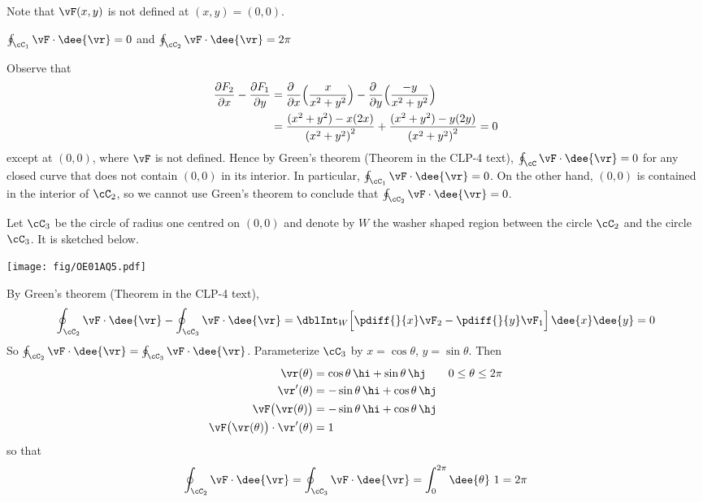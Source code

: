 \begin{hint}
Note that $\vF(x,y)$ is not defined at $(x,y)=(0,0)$.
\end{hint}

\begin{answer}
$\oint_{\cC_1}\vF\cdot \dee{\vr}=0$ and $\oint_{\cC_2}\vF\cdot \dee{\vr}=2\pi$
\end{answer}

\begin{solution}
Observe that
\begin{align*}
\frac{\partial F_2}{\partial x}
-\frac{\partial F_1}{\partial y}
&=\frac{\partial \hfill}{\partial x}\Big( \frac{x}{x^2+y^2}\Big)
-\frac{\partial \hfill}{\partial y}\Big( \frac{-y}{x^2+y^2}\Big)\\
&=\frac{(x^2+y^2)-x(2x)}{{(x^2+y^2)}^2}
+\frac{(x^2+y^2)-y(2y)}{{(x^2+y^2)}^2}=0
\end{align*}
except at $(0,0)$, where $\vF$ is not defined. Hence by Green's theorem
(Theorem  in the CLP-4 text),
$\oint_{\cC}\vF\cdot \dee{\vr}=0$ for any closed curve that does not contain
$(0,0)$ in its interior.
In particular, $\oint_{\cC_1}\vF\cdot \dee{\vr}=0$. On the other hand,
$(0,0)$ is contained in the interior of $\cC_2$, so we cannot use
Green's theorem to conclude that $\oint_{\cC_2}\vF\cdot \dee{\vr}=0$.

Let $\cC_3$ be the circle of radius one centred on $(0,0)$ and
denote by $W$ the washer shaped region between the circle
$\cC_2$ and the circle $\cC_3$. It is sketched below.

\begin{center}
   \texttt{[image: fig/OE01AQ5.pdf]}
\end{center}

 By Green's theorem (Theorem  in the CLP-4 text),
\begin{align*}
\oint_{\cC_2}\vF\cdot \dee{\vr}-\oint_{\cC_3}\vF\cdot \dee{\vr}
=\dblInt_W \Big[\pdiff{}{x}\vF_2
-\pdiff{}{y}\vF_1\Big]\,\dee{x}\dee{y}
=0
\end{align*}
So
$\oint_{\cC_2}\vF\cdot \dee{\vr}=\oint_{\cC_3}\vF\cdot \dee{\vr}$. Parameterize
$\cC_3$ by $x=\cos\theta$, $y=\sin\theta$. Then
\begin{align*}
\vr(\theta)&=\cos\theta\,\hi+\sin\theta\,\hj\qquad 0\le \theta\le 2\pi\\
\vr'(\theta)&=-\sin\theta\,\hi+\cos\theta\,\hj\\
\vF\big(\vr(\theta)\big)&=-\sin\theta\,\hi+\cos\theta\,\hj\\
\vF\big(\vr(\theta)\big)\cdot\vr'(\theta)
&=1\\
\end{align*}
so that
$$
\oint_{\cC_2}\vF\cdot \dee{\vr}
=\oint_{\cC_3}\vF\cdot \dee{\vr}
=\int_0^{2\pi} \dee{\theta}\ 1
=2\pi
$$
\end{solution}

